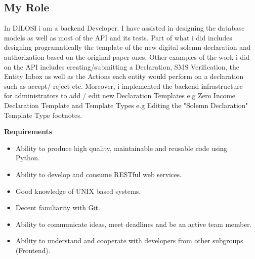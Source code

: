 \subsection{My Role}
In DILOSI i am a backend Developer. I have assisted in designing the database models as well as
most of the API and its tests. Part of what i did includes designing programatically the template
of the new digital solemn declaration and authorization based on the original paper ones. Other examples of the work i did on the API includes creating/submitting a Declaration, SMS Verification,  the Entity Inbox as well as the Actions each entity would perform on a declaration such as accept/ reject etc. Moreover, i implemented the backend infrastructure for administrators to add / edit new Declaration Templates e.g Zero Income Declaration Template and Template Types e.g Editing the "Solemn Declaration" Template Type footnotes. 

\textbf{Requirements}
\begin{itemize}
	\item Ability to produce high quality, maintainable and reusable code using Python.
	\item Ability to develop and consume RESTful web services.
	\item Good knowledge of UNIX based systems.
	\item Decent familiarity with Git.
	\item Ability to communicate ideas, meet deadlines and be an active team member.
	\item Ability to understand and cooperate with developers from other subgroups (Frontend).
\end{itemize}